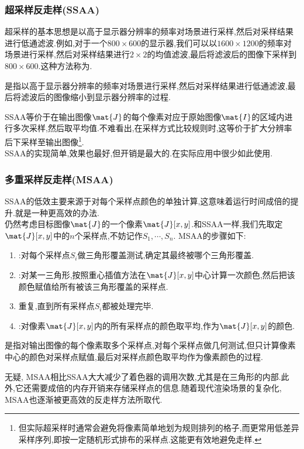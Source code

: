 \documentclass{ctexart}
\begin{document}
\subsubsection{超采样反走样(SSAA)}
超采样的基本思想是以高于显示器分辨率的频率对场景进行采样,然后对采样结果进行低通滤波.例如,对于一个$800\times600$的显示器,我们可以以$1600\times1200$的频率对场景进行采样,然后对采样结果进行$2\times2$的均值滤波,最后将滤波后的图像下采样到$800\times600$.这种方法称为.
\begin{definition}[SSAA]
    是指以高于显示器分辨率的频率对场景进行采样,然后对采样结果进行低通滤波,最后将滤波后的图像缩小到显示器分辨率的过程.
\end{definition}
SSAA等价于在输出图像$\mat{J}$的每个像素对应于原始图像$\mat{I}$的区域内进行多次采样,然后取平均值.不难看出,在采样方式比较规则时,这等价于扩大分辨率后下采样至输出图像\footnote{但实际超采样时通常会避免将像素简单地划为规则排列的格子,而更常用低差异采样序列,即按一定随机形式排布的采样点.这能更有效地避免走样.}.\\
\indent SSAA的实现简单,效果也最好,但开销是最大的.在实际应用中很少如此使用.
\subsubsection{多重采样反走样(MSAA)}
SSAA的低效主要来源于对每个采样点颜色的单独计算,这意味着运行时间成倍的提升.就是一种更高效的办法.\\
\indent 仍然考虑目标图像$\mat{J}$的一个像素$\mat{J}[x,y]$.和SSAA一样,我们先取定$\mat{J}[x,y]$中的$n$个采样点,不妨记作$S_1,\cdots,S_n$. MSAA的步骤如下:
\begin{enumerate}[label=\tbf{\arabic*}.,topsep=0pt,parsep=0pt,itemsep=0pt,partopsep=0pt]
    \item {}:对每个采样点$S_i$做三角形覆盖测试,确定其最终被哪个三角形覆盖.
    \item {}:对某一三角形,按照重心插值方法在$\mat{J}[x,y]$中心计算一次颜色,然后把该颜色赋值给所有被该三角形覆盖的采样点.
    \item 重复,直到所有采样点$S_i$都被处理完毕.
    \item {}:对像素$\mat{J}[x,y]$内的所有采样点的颜色取平均,作为$\mat{J}[x,y]$的颜色.
\end{enumerate}
\begin{definition}[MSAA]
    是指对输出图像的每个像素取多个采样点,对每个采样点做几何测试,但只计算像素中心的颜色对采样点赋值,最后对采样点颜色取平均作为像素颜色的过程.
\end{definition}
无疑, MSAA相比SSAA大大减少了着色器的调用次数,尤其是在三角形的内部.此外,它还需要成倍的内存开销来存储采样点的信息.随着现代渲染场景的复杂化, MSAA也逐渐被更高效的反走样方法所取代.
\end{document}

